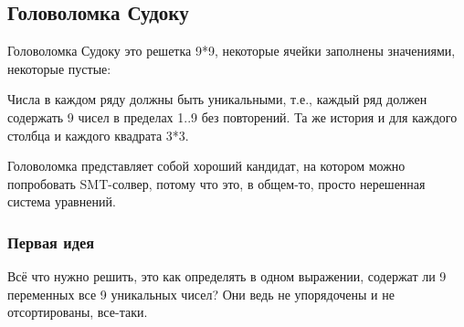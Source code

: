 \subsection{Головоломка Судоку}
\label{sudoku_SMT}

Головоломка Судоку это решетка 9*9, некоторые ячейки заполнены значениями, некоторые пустые:


\newcommand\setrow[9]{
  \setcounter{col}{1}
  \foreach \n in {#1, #2, #3, #4, #5, #6, #7, #8, #9} {
    \edef\x{\value{col} - 0.5}
    \edef\y{9.5 - \value{row}}
    \node[anchor=center] at (\x, \y) {\n};
    \stepcounter{col}
  }
  \stepcounter{row}
}

\begin{center}
\end{center}

Числа в каждом ряду должны быть уникальными, т.е., каждый ряд должен содержать 9 чисел в пределах 1..9 без повторений.
Та же история и для каждого столбца и каждого квадрата 3*3.

Головоломка представляет собой хороший кандидат, на котором можно попробовать \ac{SMT}-солвер, потому что это,
в общем-то, просто нерешенная система уравнений.

\subsubsection{Первая идея}

Всё что нужно решить, это как определять в одном выражении, содержат ли 9 переменных все 9 уникальных чисел?
Они ведь не упорядочены и не отсортированы, все-таки.

